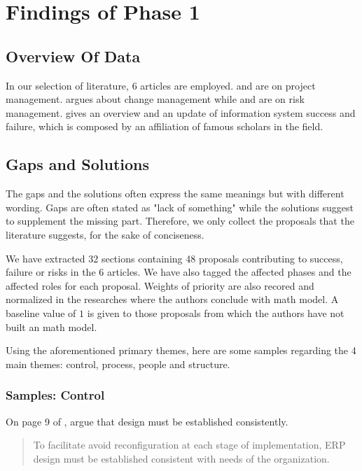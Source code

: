 
\section{Findings of Phase 1}

\subsection{Overview Of Data}
In our selection of literature, 6 articles are employed.  and  are on project management.  argues about change management while  and  are on risk management.  gives an overview and an update of information system success and failure, which is composed by an affiliation of famous scholars in the field.

\subsection{Gaps and Solutions}
The gaps and the solutions often express the same meanings but with different wording. Gaps are often stated as "lack of something" while the solutions suggest to supplement the missing part. Therefore, we only collect the proposals that the literature suggests, for the sake of conciseness.

We have extracted 32 sections containing 48 proposals contributing to success, failure or risks in the 6 articles. We have also tagged the affected phases and the affected roles for each proposal. Weights of priority are also recored and normalized in the researches where the authors conclude with math model. A baseline value of $1$ is given to those proposals from which the authors have not built an math model.

Using the aforementioned primary themes, here are some samples regarding the 4 main themes: control, process, people and structure.

\subsubsection{Samples: Control}

On page 9 of , \citeauthor{3} argue that design must be established consistently.
\begin{quotation}
To facilitate avoid reconfiguration at each stage of implementation, ERP design must be established consistent with needs of the organization.
\end{quotation}

